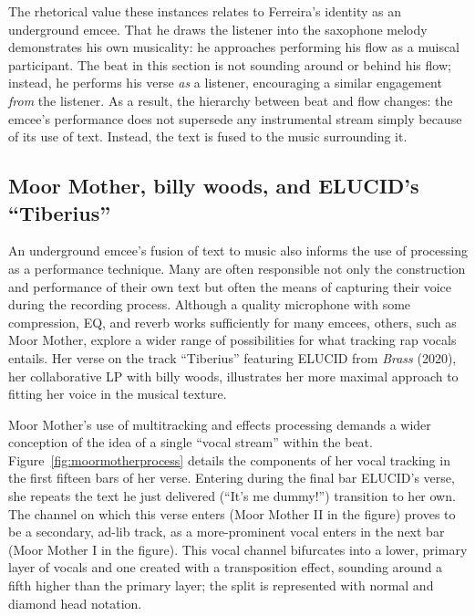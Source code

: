 The rhetorical value these instances relates to Ferreira's identity as an underground emcee. That he draws the
listener into the saxophone melody demonstrates his own musicality: he approaches performing his flow as a muiscal
participant. The beat in this section is not sounding around or behind his flow; instead, he performs his verse
\emph{as} a listener, encouraging a similar engagement \emph{from} the listener. As a result, the hierarchy between
beat and flow changes: the emcee's performance does not supersede any instrumental stream simply because of its use
of text. Instead, the text is fused to the music surrounding it.

{}
\subsection*{\centering Moor Mother,  billy woods, and ELUCID's ``Tiberius''}

An underground emcee's fusion of text to music also informs the use of processing as a performance technique. Many 
are often responsible not only the construction and performance of their own text but often the means of capturing
their voice during the recording process. Although a quality microphone with some compression, EQ, and reverb works
sufficiently for many emcees, others, such as Moor Mother, explore a wider range of possibilities for what tracking
rap vocals entails. Her verse on the track ``Tiberius'' featuring ELUCID from \textit{Brass} (2020), her collaborative
LP with billy woods, illustrates her more maximal approach to fitting her voice in the musical texture.

Moor Mother's use of multitracking and effects processing demands a wider conception of the idea of a single ``vocal 
stream'' within the beat. Figure~\ref{fig:moormotherprocess} details the components of her vocal tracking in the 
first fifteen bars of her verse. Entering during the final bar ELUCID's verse, she repeats the text he just delivered
(``It's me dummy!'') transition to her own. The channel on which this verse enters (Moor Mother II in the figure) 
proves to be a secondary, ad-lib track, as a more-prominent vocal enters in the next bar (Moor Mother I in the figure).
This vocal channel bifurcates into a lower, primary layer of vocals and one created with a transposition effect, 
sounding around a fifth higher than the primary layer; the split is represented with normal and diamond head notation.

